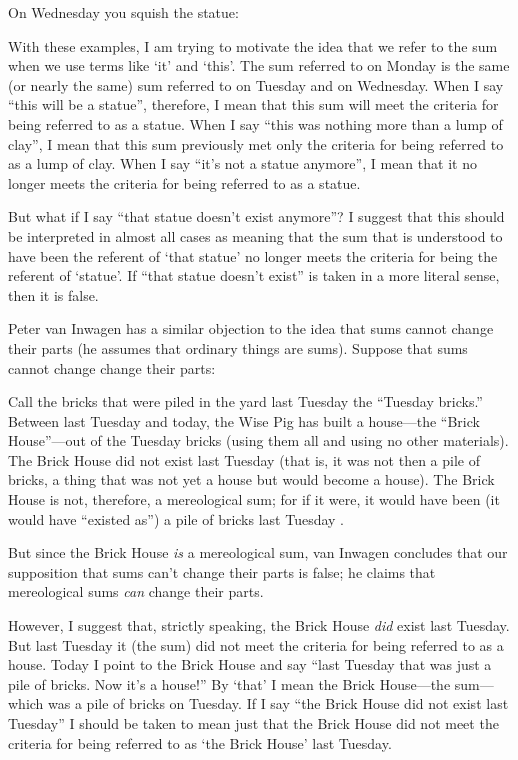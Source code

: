 \documentclass[11pt]{article}
\newenvironment{squote}{%
\begin{spacing}{1}
\begin{list}{}{%
\setlength{\labelwidth}{0pt}%
\rightmargin\leftmargin%
}
\item\relax
}{%
\end{list}%
\end{spacing}
}
\begin{document}
\begin{spacing}{1.5}
On Wednesday you squish the statue:


With these examples, I am trying to motivate the idea that we refer to
the sum when we use terms like `it' and `this'.  The sum referred to
on Monday is the same (or nearly the same) sum referred to on Tuesday
and on Wednesday.  When I say ``this will be a statue'', therefore, I
mean that this sum will meet the criteria for being referred to as a
statue.  When I say ``this was nothing more than a lump of clay'', I
mean that this sum previously met only the criteria for being referred
to as a lump of clay.  When I say ``it's not a statue anymore'', I
mean that it no longer meets the criteria for being referred to as a
statue.

But what if I say ``that statue doesn't exist anymore''?  I suggest
that this should be interpreted in almost all cases as meaning that
the sum that is understood to have been the referent of `that statue'
no longer meets the criteria for being the referent of `statue'.  If
``that statue doesn't exist'' is taken in a more literal sense, then
it is false.

Peter van Inwagen has a similar objection to the idea that sums cannot
change their parts (he assumes that ordinary things are sums).
Suppose that sums cannot change change their parts:

\begin{squote}
Call the bricks that were piled in the yard last Tuesday the ``Tuesday
bricks.''  Between last Tuesday and today, the Wise Pig has built a
house---the ``Brick House''---out of the Tuesday bricks (using them
all and using no other materials).  The Brick House did not exist last
Tuesday (that is, it was not then a pile of bricks, a thing that was
not yet a house but would become a house).  The Brick House is not,
therefore, a mereological sum; for if it were, it would have been (it
would have ``existed as'') a pile of bricks last Tuesday
\citeyearpar[616]{inwagen2006}.
\end{squote}

But since the Brick House {\em is} a mereological sum, van Inwagen
concludes that our supposition that sums can't change their parts is
false; he claims that mereological sums {\em can} change their parts.

However, I suggest that, strictly speaking, the Brick House {\em did}
exist last Tuesday.  But last Tuesday it (the sum) did not meet the
criteria for being referred to as a house.  Today I point to the Brick
House and say ``last Tuesday that was just a pile of bricks.  Now it's
a house!''  By `that' I mean the Brick House---the sum---which was a
pile of bricks on Tuesday.  If I say ``the Brick House did not exist
last Tuesday'' I should be taken to mean just that the Brick House did
not meet the criteria for being referred to as `the Brick House' last
Tuesday.


\end{spacing}
\end{document}
